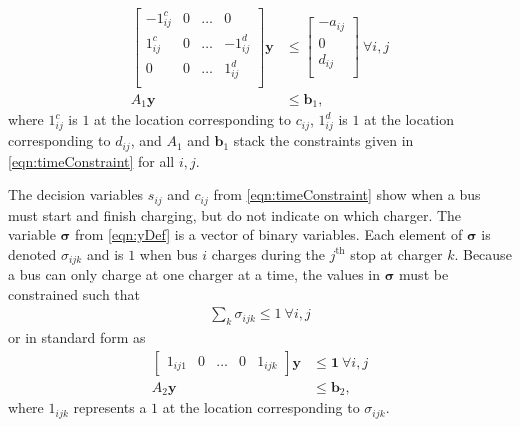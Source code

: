 \begin{equation} \begin{aligned}
	\begin{bmatrix}
		-1^c_{ij} & 0 & \hdots &  0        \\
	         1^c_{ij} & 0 & \hdots & -1^d_{ij} \\
		 0        & 0 & \hdots &  1^d_{ij} \\ 
	\end{bmatrix}
	\mathbf{y} &\le 
	\begin{bmatrix}
	        -a_{ij} \\ 
		 0      \\ 
		 d_{ij} \\
	\end{bmatrix} \ \forall i,j \\
	A_1\mathbf{y} &\le \mathbf{b}_1,
\end{aligned} \end{equation}
	where $1^c_{ij}$ is $1$ at the location corresponding to $c_{ij}$, $1^d_{ij}$ is $1$ at the location corresponding to $d_{ij}$, and $A_1$ and $\mathbf{b}_1$ stack the constraints given in \eqref{eqn:timeConstraint} for all $i,j$.
	\par The decision variables $s_{ij}$ and $c_{ij}$ from \eqref{eqn:timeConstraint} show when a bus must start and finish charging, but do not indicate on which charger. The variable $\boldsymbol{\sigma}$ from \eqref{eqn:yDef} is a vector of binary variables. Each element of $\boldsymbol{\sigma}$ is denoted $\sigma_{ijk}$ and is $1$ when bus $i$ charges during the $j^{\text{th}}$ stop at charger $k$. Because a bus can only charge at one charger at a time, the values in $\boldsymbol{\sigma}$ must be constrained such that
\begin{equation}
	\begin{aligned}
		\sum_k \sigma_{ijk} \le 1 \ \forall i,j
	\end{aligned}
\end{equation} 
or in standard form as 
\begin{equation} \begin{aligned}
	\begin{bmatrix}1_{ij1} & 0 & \hdots & 0 & 1_{ijk} \end{bmatrix} \mathbf{y} &\le \mathbf{1} \ \forall i,j\\
		A_2\mathbf{y} & \le \mathbf{b}_2,
\end{aligned} \end{equation}
where $1_{ijk}$ represents a $1$ at the location corresponding to $\sigma_{ijk}$.
